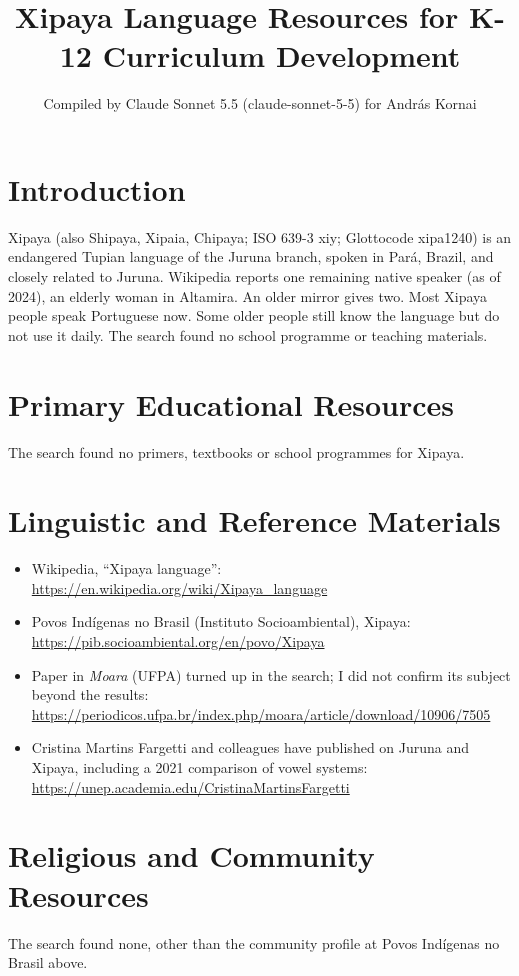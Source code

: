 \documentclass[12pt]{article}
\title{Xipaya Language Resources for K-12 Curriculum Development}
\author{Compiled by Claude Sonnet 5.5 (claude-sonnet-5-5) for Andr\'as Kornai}
\date{}
\begin{document}
\maketitle

\section{Introduction}
Xipaya (also Shipaya, Xipaia, Chipaya; ISO 639-3 xiy; Glottocode xipa1240) is an endangered Tupian language of the Juruna branch, spoken in Par\'a, Brazil, and closely related to Juruna. Wikipedia reports one remaining native speaker (as of 2024), an elderly woman in Altamira. An older mirror gives two. Most Xipaya people speak Portuguese now. Some older people still know the language but do not use it daily. The search found no school programme or teaching materials.

\section{Primary Educational Resources}
The search found no primers, textbooks or school programmes for Xipaya.

\section{Linguistic and Reference Materials}
\begin{itemize}
\item Wikipedia, ``Xipaya language'': \url{https://en.wikipedia.org/wiki/Xipaya_language}
\item Povos Ind\'igenas no Brasil (Instituto Socioambiental), Xipaya: \url{https://pib.socioambiental.org/en/povo/Xipaya}
\item Paper in \emph{Moara} (UFPA) turned up in the search; I did not confirm its subject beyond the results: \url{https://periodicos.ufpa.br/index.php/moara/article/download/10906/7505}
\item Cristina Martins Fargetti and colleagues have published on Juruna and Xipaya, including a 2021 comparison of vowel systems: \url{https://unep.academia.edu/CristinaMartinsFargetti}
\end{itemize}

\section{Religious and Community Resources}
The search found none, other than the community profile at Povos Ind\'igenas no Brasil above.
\end{document}
